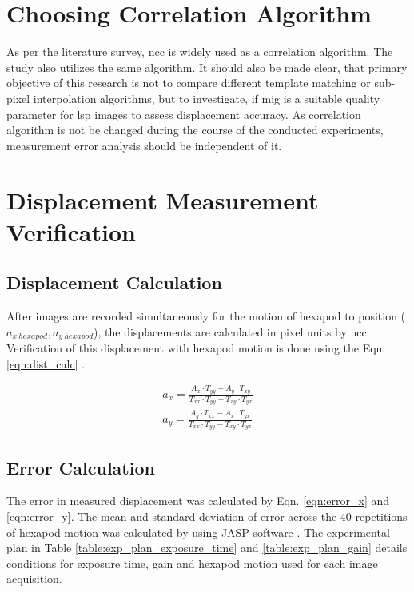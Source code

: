     
    \section{Choosing Correlation Algorithm}        
        As per the literature survey, \gls{ncc} is widely used as a correlation algorithm. The study also utilizes the same algorithm. It should also be made clear, that primary objective of this research is not to compare different template matching or sub-pixel interpolation algorithms, but to investigate, if \gls{mig} is a suitable quality parameter for \gls{lsp} images to assess displacement accuracy. As correlation algorithm is not be changed during the course of the conducted experiments, measurement error analysis should be independent of it. 
            
    
    \section{Displacement Measurement Verification}
        \subsection*{Displacement Calculation}
            \noindent After images are recorded simultaneously for the motion of hexapod to position (\(a_{x\ hexapod}, a_{y\ hexapod}\)), the displacements are calculated in pixel units by \gls{ncc}. Verification of this displacement with hexapod motion is done using the Eqn. \ref{eqn:dist_calc} \cite{charrett_2018}. 

            \begin{equation}\label{eqn:dist_calc}
                \begin{aligned}
                    a_x = \frac{A_x \cdot T_{yy} - A_y \cdot T_{xy}}{T_{xx} \cdot T_{yy} - T_{xy} \cdot T_{yx}} \\
                    a_y = \frac{A_y \cdot T_{xx} - A_x \cdot T_{yx}}{T_{xx} \cdot T_{yy} - T_{xy} \cdot T_{yx}}
                \end{aligned}
            \end{equation}

        \subsection*{Error Calculation}
            The error in measured displacement was calculated by Eqn. \ref{eqn:error_x} and \ref{eqn:error_y}. The mean and standard deviation of error across the 40 repetitions of hexapod motion was calculated by using JASP software \cite{jasp_2023}. The experimental plan in Table \ref{table:exp_plan_exposure_time} and \ref{table:exp_plan_gain} details conditions for exposure time, gain and hexapod motion used for each image acquisition.
            
